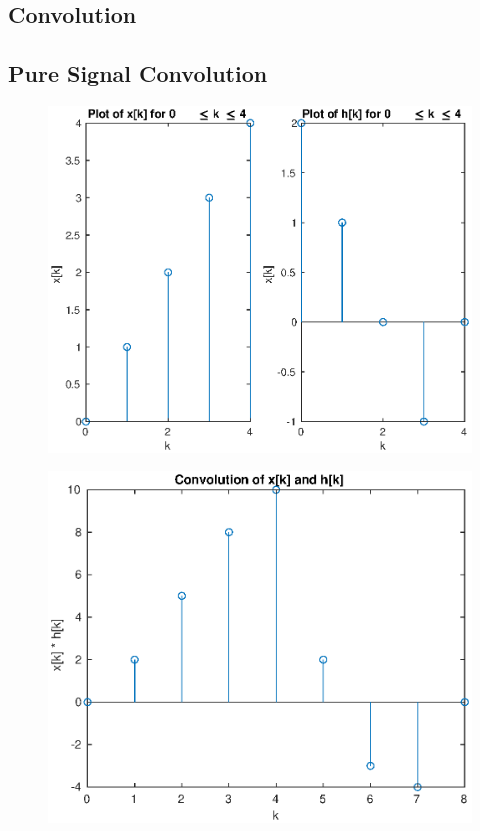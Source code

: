 \documentclass{article}
\begin{document}
\begin{multicols}{2}
    \section{Convolution}
    \subsection{Pure Signal Convolution}
    \begin{figure}[H]
        \centering
        \includegraphics[width=\linewidth]{plot1}
        \caption{}
    \end{figure}
    \begin{figure}[H]
        \centering
        \includegraphics[width=\linewidth]{plot2}
        \caption{}
    \end{figure}

\end{multicols}
\end{document}
